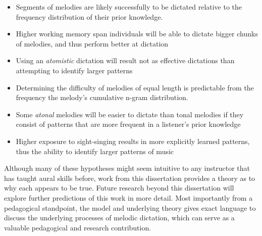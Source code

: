 \documentclass[]{book}
\providecommand{\tightlist}{%
  \setlength{\itemsep}{0pt}\setlength{\parskip}{0pt}}
\begin{document}
\begin{itemize}
\tightlist
\item
  Segments of melodies are likely successfully to be dictated relative to the frequency distribution of their prior knowledge.
\item
  Higher working memory span individuals will be able to dictate bigger chunks of melodies, and thus perform better at dictation
\item
  Using an \emph{atomistic} dictation will result not as effective dictations than attempting to identify larger patterns
\item
  Determining the difficulty of melodies of equal length is predictable from the frequency the melody's cumulative n-gram distribution.
\item
  Some \emph{atonal} melodies will be easier to dictate than tonal melodies if they consist of patterns that are more frequent in a listener's prior knowledge
\item
  Higher exposure to sight-singing results in more explicitly learned patterns, thus the ability to identify larger patterns of music
\end{itemize}

Although many of these hypotheses might seem intuitive to any instructor that has taught aural skills before, work from this dissertation provides a theory as to why each appears to be true.
Future research beyond this dissertation will explore further predictions of this work in more detail.
Most importantly from a pedagogical standpoint, the model and underlying theory gives exact language to discuss the underlying processes of melodic dictation, which can serve as a valuable pedagogical and research contribution.


\end{document}

